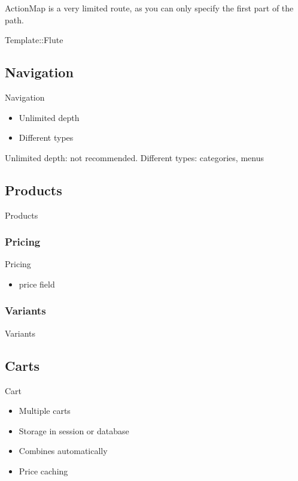 ActionMap is a very limited route, as you can only
specify the first part of the path.

\begin{frame}{Template::Flute}
\end{frame}

\subsection{Navigation}
\begin{frame}{Navigation}
\begin{itemize}
\item Unlimited depth
\item Different types
\end{itemize}
\end{frame}

Unlimited depth: not recommended.
Different types: categories, menus

\subsection{Products}
\begin{frame}{Products}
\end{frame}

\subsubsection{Pricing}
\begin{frame}{Pricing}
\begin{itemize}
\item price field
\end{itemize}
\end{frame}


\subsubsection{Variants}
\begin{frame}{Variants}
\end{frame}

\subsection{Carts}
\begin{frame}{Cart}
\begin{itemize}
\item Multiple carts
\item Storage in session or database
\item Combines automatically
\item Price caching
\end{itemize}
\end{frame}

